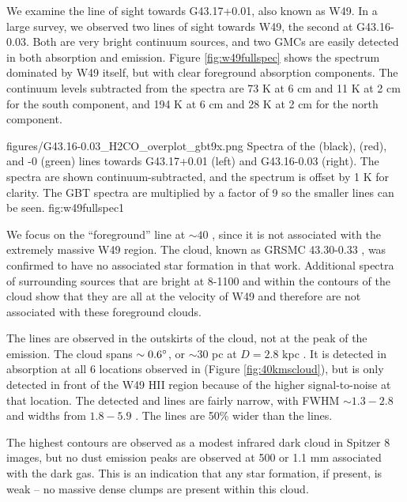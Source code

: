 We examine the line of sight towards G43.17+0.01, also known as W49.  In a 
large survey, we observed two lines of sight towards W49, the second at
G43.16-0.03.  Both are very bright continuum sources, and two GMCs are easily
detected in both \formaldehyde absorption and \thirteenco emission.  Figure
\ref{fig:w49fullspec} shows the spectrum dominated by W49 itself, but with
clear foreground absorption components.  The continuum levels subtracted from the spectra
are 73 K at 6 cm and 11 K at 2 cm for the south component, and 194 K at 6 cm
and 28 K at 2 cm for the north component.


          {figures/G43.16-0.03_H2CO_overplot_gbt9x.png}
{Spectra of the \formaldehyde \oneone (black), \twotwo (red), and -0 (green) lines towards G43.17+0.01 (left) and G43.16-0.03 (right).
The \formaldehyde spectra are shown continuum-subtracted, and the \thirteenco
spectrum is offset by 1 K for clarity.  The GBT \twotwo spectra are multiplied
by a factor of 9 so the smaller lines can be seen.  
}{fig:w49fullspec}{1}

We focus on the ``foreground'' line at $\sim40$ \kms, since it is not
associated with the extremely massive W49 region.  The cloud, known as GRSMC
43.30-0.33 \citep{Simon2001a}, was confirmed to have no associated star
formation in that work.  Additional \formaldehyde spectra of surrounding
sources that are bright at 8-1100 \um and within the \thirteenco contours of
the cloud show that they are all at the velocity of W49 and therefore are not
associated with these foreground clouds.  

The \formaldehyde lines are observed in the outskirts of the cloud, not at
the peak of the \thirteenco emission.  The cloud spans $\sim0.6^{\circ}$, or
$\sim30$ pc at $D=2.8$ kpc \citep{Roman-Duval2009a}.  It is detected in \oneone
absorption at all 6 locations observed in \formaldehyde (Figure
\ref{fig:40kmscloud}), but \twotwo is only detected in front of the W49 HII
region because of the higher signal-to-noise at that location.  The detected
\thirteenco and \formaldehyde lines are fairly narrow, with \formaldehyde FWHM
$\sim1.3-2.8$ \kms and \thirteenco widths from $1.8-5.9$ \kms.  The \thirteenco
lines are 50\% wider than the \formaldehyde lines.

The highest \thirteenco contours are observed as a modest infrared dark cloud
in Spitzer 8 \um images, but no dust emission peaks are observed at 500 \um or
1.1 mm associated with the dark gas.  This is an indication that any star
formation, if present, is weak -- no massive dense clumps are present within
this cloud.

